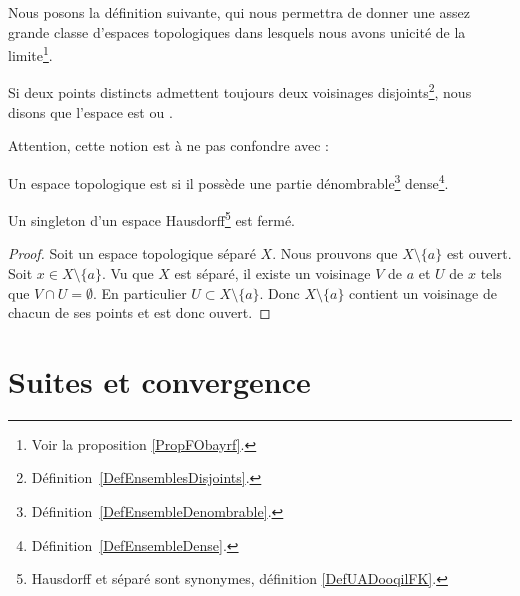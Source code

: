 Nous posons la définition suivante, qui nous permettra de donner une assez grande classe d'espaces topologiques dans lesquels nous avons unicité de la limite\footnote{Voir la proposition \ref{PropFObayrf}.}.

\begin{definition}  \label{DefYFmfjjm}
	Si deux points distincts admettent toujours deux voisinages disjoints\footnote{Définition~\ref{DefEnsemblesDisjoints}.}, nous disons que l'espace est  ou .
\end{definition}

Attention, cette notion est à ne pas confondre avec :
\begin{definition}  \label{DefUADooqilFK}
	Un espace topologique est  si il possède une partie dénombrable\footnote{Définition~\ref{DefEnsembleDenombrable}.} dense\footnote{Définition~\ref{DefEnsembleDense}.}.
\end{definition}

\begin{lemma}	\label{LEMooXNSCooQYkmAN}
	Un singleton d'un espace Hausdorff\footnote{Hausdorff et séparé sont synonymes, définition \ref{DefUADooqilFK}.} est fermé.
\end{lemma}

\begin{proof}
	Soit un espace topologique séparé \( X\). Nous prouvons que \( X\setminus\{ a \} \) est ouvert. Soit \( x\in X\setminus\{ a \}\). Vu que \( X\) est séparé, il existe un voisinage \( V\) de \( a\) et \( U\) de \( x\) tels que \( V\cap U=\emptyset\). En particulier \( U\subset X\setminus\{ a \}\). Donc \( X\setminus\{ a \}\) contient un voisinage de chacun de ses points et est donc ouvert.
\end{proof}


\section{Suites et convergence}

